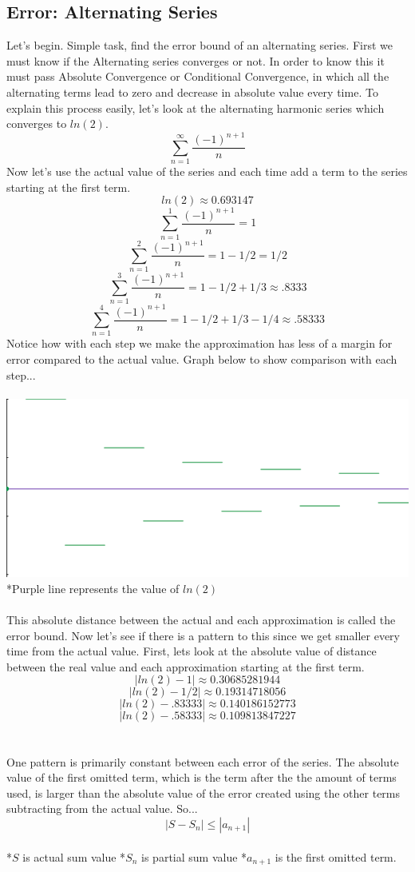 \documentclass[a4paper,openright, 14pt]{article}
\begin{document}
\subsection*{Error: Alternating Series}
Let's begin. Simple task, find the error bound of an alternating series. First we must know if the Alternating series converges or not. In order to know this it must pass Absolute Convergence or Conditional Convergence, in which all the alternating terms lead to zero and decrease in absolute value every time. To explain this process easily, let's look at the alternating harmonic series which converges to $ln(2)$.
$$\sum_{n=1} ^{\infty} \frac{(-1)^{n+1}}{n}$$
Now let's use the actual value of the series and each time add a term to the series starting at the first term.
$$ln(2)\approx 0.693147$$
$$\sum_{n=1} ^1 \frac{(-1)^{n+1}}{n}=1$$
$$\sum_{n=1} ^2 \frac{(-1)^{n+1}}{n}=1-1/2=1/2$$
$$\sum_{n=1} ^3 \frac{(-1)^{n+1}}{n}=1-1/2+1/3\approx.8333$$
$$\sum_{n=1} ^4 \frac{(-1)^{n+1}}{n}=1-1/2+1/3-1/4\approx.58333$$
Notice how with each step we make the approximation has less of a margin for error compared to the actual value. Graph below to show comparison with each step...\\\\
\includegraphics[width = 15cm, height = 3 cm]{fml.png}
\\
*Purple line represents the value of $ln(2)$\\\\

This absolute distance between the actual and each approximation is called the error bound. Now let's see if there is a pattern to this since we get smaller every time from the actual value. First, lets look at the absolute value of distance between the real value and each approximation starting at the first term.
$$|ln(2)-1|\approx0.30685281944$$
$$|ln(2)-1/2|\approx0.19314718056$$
$$|ln(2)-.83333|\approx 0.140186152773$$
$$|ln(2)-.58333|\approx 0.109813847227$$
\\\\
One pattern is primarily constant between each error of the series. The absolute value of the first omitted term, which is the term after the the amount of terms used, is larger than the absolute value of the error created using the other terms subtracting from the actual value. So...
\\
$$|S-S_n|\leq|a_{n+1} |$$
\\
*$S$ is actual sum value 
*$S_n$ is partial sum value 
*$a_{n+1}$ is the first omitted term.\\\\
\end{document}
